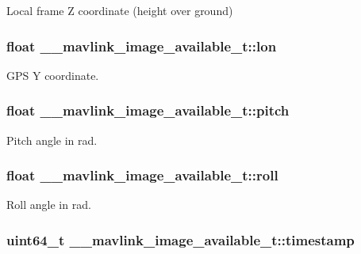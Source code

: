 Local frame Z coordinate (height over ground) 

\hypertarget{struct____mavlink__image__available__t_a50de3c4b3b923b79096e95cf1b02855d}{
\subsubsection[{lon}]{\setlength{\rightskip}{0pt plus 5cm}float \+\_\+\+\_\+mavlink\+\_\+image\+\_\+available\+\_\+t\+::lon}}\label{struct____mavlink__image__available__t_a50de3c4b3b923b79096e95cf1b02855d}


G\+P\+S Y coordinate. 

\hypertarget{struct____mavlink__image__available__t_a5ee810fc74de0b1113b9e9c0419de043}{
\subsubsection[{pitch}]{\setlength{\rightskip}{0pt plus 5cm}float \+\_\+\+\_\+mavlink\+\_\+image\+\_\+available\+\_\+t\+::pitch}}\label{struct____mavlink__image__available__t_a5ee810fc74de0b1113b9e9c0419de043}


Pitch angle in rad. 

\hypertarget{struct____mavlink__image__available__t_a70a2b5f46ce055f4cfa6c903438a7ca8}{
\subsubsection[{roll}]{\setlength{\rightskip}{0pt plus 5cm}float \+\_\+\+\_\+mavlink\+\_\+image\+\_\+available\+\_\+t\+::roll}}\label{struct____mavlink__image__available__t_a70a2b5f46ce055f4cfa6c903438a7ca8}


Roll angle in rad. 

\hypertarget{struct____mavlink__image__available__t_aacc732ef97c4f29be485280afe6a5031}{
\subsubsection[{timestamp}]{\setlength{\rightskip}{0pt plus 5cm}uint64\+\_\+t \+\_\+\+\_\+mavlink\+\_\+image\+\_\+available\+\_\+t\+::timestamp}}\label{struct____mavlink__image__available__t_aacc732ef97c4f29be485280afe6a5031}


